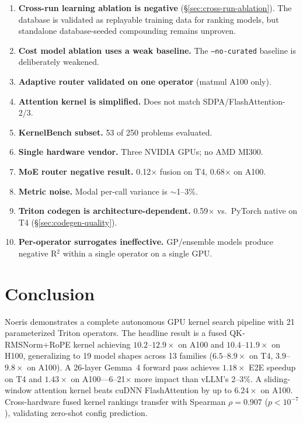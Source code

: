 \documentclass[11pt]{article}
\begin{document}
\begin{enumerate}[leftmargin=*,itemsep=2pt]
\item \textbf{Cross-run learning ablation is negative} (\S\ref{sec:cross-run-ablation}).
The database is validated as replayable training data for ranking models, but
standalone database-seeded compounding remains unproven.

\item \textbf{Cost model ablation uses a weak baseline.} The
\texttt{--no-curated} baseline is deliberately weakened.

\item \textbf{Adaptive router validated on one operator} (matmul A100 only).

\item \textbf{Attention kernel is simplified.} Does not match SDPA/FlashAttention-2/3.

\item \textbf{KernelBench subset.} 53 of 250 problems evaluated.

\item \textbf{Single hardware vendor.} Three NVIDIA GPUs; no AMD MI300.

\item \textbf{MoE router negative result.} 0.12$\times$ fusion on T4, 0.68$\times$ on A100.

\item \textbf{Metric noise.} Modal per-call variance is ${\sim}$1--3\%.

\item \textbf{Triton codegen is architecture-dependent.} 0.59$\times$ vs.\ PyTorch native
on T4 (\S\ref{sec:codegen-quality}).

\item \textbf{Per-operator surrogates ineffective.} GP/ensemble models produce
negative R$^2$ within a single operator on a single GPU.
\end{enumerate}


\section{Conclusion}
\label{sec:conclusion}

Noeris demonstrates a complete autonomous GPU kernel search pipeline with
21 parameterized Triton operators. The headline result is a fused
QK-RMSNorm+RoPE kernel achieving $10.2$--$12.9\times$ on A100 and
$10.4$--$11.9\times$ on H100, generalizing to 19 model shapes across 13
families ($6.5$--$8.9\times$ on T4, $3.9$--$9.8\times$ on A100). A 26-layer
Gemma~4 forward pass achieves $1.18\times$ E2E speedup on T4 and $1.43\times$ on
A100---6--21$\times$ more impact than vLLM's 2--3\%. A sliding-window attention
kernel beats cuDNN FlashAttention by up to $6.24\times$ on A100. Cross-hardware
fused kernel rankings transfer with Spearman $\rho = 0.907$
($p < 10^{-7}$), validating zero-shot config prediction.
\end{document}
